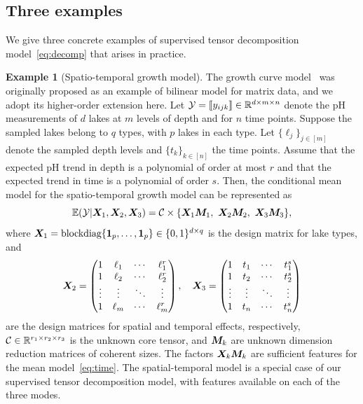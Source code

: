 \documentclass[12pt]{article}
\theoremstyle{plain}
\theoremstyle{definition}
\newtheorem{example}{Example}
\begin{document}
\subsection{Three examples}
We give three concrete examples of supervised tensor decomposition model~\eqref{eq:decomp} that arises in practice. 
\begin{example}[Spatio-temporal growth model]
The growth curve model~\citep{gabriel1998generalised,potthoff1964generalized,srivastava2008models} was originally proposed as an example of bilinear model for matrix data, and we adopt its higher-order extension here. Let $\mathcal{Y}=\llbracket y_{ijk} \rrbracket\in\mathbb{R}^{d \times m\times n}$ denote the pH measurements of $d$ lakes at $m$ levels of depth and for $n$ time points. Suppose the sampled lakes belong to $q$ types, with $p$ lakes in each type. Let $\{\ell_j\}_{j\in[m]}$ denote the sampled depth levels and $\{t_k\}_{k\in[n]}$ the time points. Assume that the expected pH trend in depth is a polynomial of order at most $r$ and that the expected trend in time is a polynomial of order $s$. Then, the conditional mean model for the spatio-temporal growth model can be represented as
\begin{equation}\label{eq:time}
\mathbb{E}(\tY|\mX_1,\mX_2,\mX_3)=\tC\times\{\mX_1\mM_1,\ \mX_2\mM_2,\ \mX_3\mM_3\},
\end{equation}
where $\bm X_1=\text{blockdiag}\{\mathbf{1}_p,\ldots,\mathbf{1}_p\}\in \{0,1\}^{d\times q}$ is the design matrix for lake types, and
\[
\bm X_2=
\begin{pmatrix}
1 & \ell_1&\cdots &\ell^{r}_1\\
1 & \ell_2&\cdots &\ell^{r}_2\\
\vdots &\vdots&\ddots&\vdots\\
1&\ell_{m}&\cdots&\ell^{r}_{m}
\end{pmatrix},\quad
\bm X_3=
\begin{pmatrix}
1 & t_1&\cdots &t^{s}_1\\
1 & t_2&\cdots &t^{s}_2\\
\vdots &\vdots&\ddots&\vdots\\
1&t_{n}&\cdots&t^{s}_{n}
\end{pmatrix}
\]
are the design matrices for spatial and temporal effects, respectively, $\mathcal{C}\in\mathbb{R}^{r_1\times r_2\times r_3}$ is the unknown core tensor, and $\bm M_k$ are unknown dimension reduction matrices of coherent sizes. The factors $\bm X_k\bm M_k$ are sufficient features for the mean model~\eqref{eq:time}. The spatial-temporal model is a special case of our supervised tensor decomposition model, with features available on each of the three modes.
\end{example}
\end{document}
